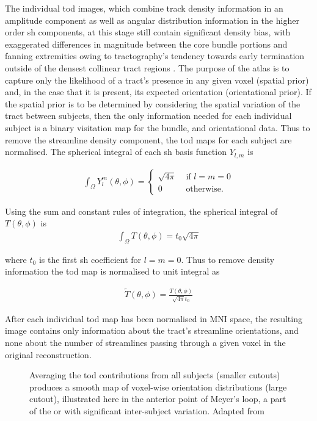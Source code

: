 The individual \gls{tod} images, which combine track density information in an amplitude component as well as angular distribution information in the higher order \gls{sh} components, at this stage still contain significant density bias, with exaggerated differences in magnitude between the core bundle portions and fanning extremities owing to tractography's tendency towards early termination outside of the densest collinear tract regions \autocite{Smith2013,Calamante2015,Rheault2020}.
The purpose of the atlas is to capture only the likelihood of a tract's presence in any given voxel (spatial prior) and, in the case that it is present, its expected orientation (orientational prior).
If the spatial prior is to be determined by considering the spatial variation of the tract between subjects, then the only information needed for each individual subject is a binary visitation map for the bundle, and orientational data.
Thus to remove the streamline density component, the \gls{tod} maps for each subject are normalised.
The spherical integral of each \gls{sh} basis function $Y_{l,m}$ is

\begin{align}
  \int_{\Omega} Y^m_l(\theta, \phi) = \begin{cases}
   \sqrt{4\pi} & \text{ if } l=m=0\\
   0 & \text{ otherwise. }
  \end{cases}
\end{align}

Using the sum and constant rules of integration, the spherical integral of $T(\theta,\phi)$ is
\begin{align}
  \int_{\Omega} T(\theta,\phi) = t_0 \sqrt{4\pi}
\end{align}

where $t_0$ is the first \gls{sh} coefficient for $l=m=0$. Thus to remove density information the \gls{tod} map is normalised to unit integral as

\begin{align}
  \widetilde{T}(\theta, \phi) = \frac{T(\theta,\phi)}{\sqrt{4\pi} t_0}
\end{align}

After each individual \gls{tod} map has been normalised in MNI space, the resulting image contains only information about the tract's streamline orientations, and none about the number of streamlines passing through a given voxel in the original reconstruction.

\begin{SCfigure}
  
  \caption{Averaging the \gls{tod} contributions from all subjects (smaller cutouts) produces a smooth map of voxel-wise orientation distributions (large cutout), illustrated here in the anterior point of Meyer's loop, a part of the \gls{or} with significant inter-subject variation. Adapted from \textcite{Young2024}}
  \label{fig:todmean}
\end{SCfigure}

